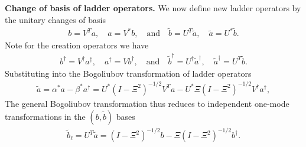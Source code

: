 \documentclass[../QFT_main.tex]{subfiles}
\begin{document}
\begin{mytheorem}
\noindent
\textbf{Change of basis of ladder operators.}
We now define new ladder operators by the unitary changes of basis
\begin{align}
    b = V^T a,\quad a = V^* b,\quad \text{and}\quad \tilde{b} = U^T \tilde{a}, \quad \tilde{a} = U^* \tilde{b}.
\end{align}
Note for the creation operators we have
\begin{align}
    b^\dagger = V^\dagger a^\dagger, \quad a^\dagger = V b^\dagger, \quad \text{and}\quad \tilde{b}^\dagger = U^\dagger \tilde{a}^\dagger, \quad \tilde{a}^\dagger = U^T \tilde{b}.
\end{align}
Substituting into the Bogoliubov transformation of ladder operators
\begin{align}
    \tilde{a} = \alpha^* a - \beta^* a^\dagger = U^* (I - \Xi^2)^{-1/2} V^T a -  U^* \Xi (I - \Xi^2)^{-1/2} V^\dagger a^\dagger,
\end{align}
The general Bogoliubov transformation thus reduces to independent one-mode transformations in the $(b,\tilde{b})$ bases
\begin{align}
    \tilde{b}_\ell = U^T \tilde{a} = (I - \Xi^2)^{-1/2} b - \Xi (I - \Xi^2)^{-1/2} b^\dagger.
\end{align}
\end{mytheorem}
\end{document}
